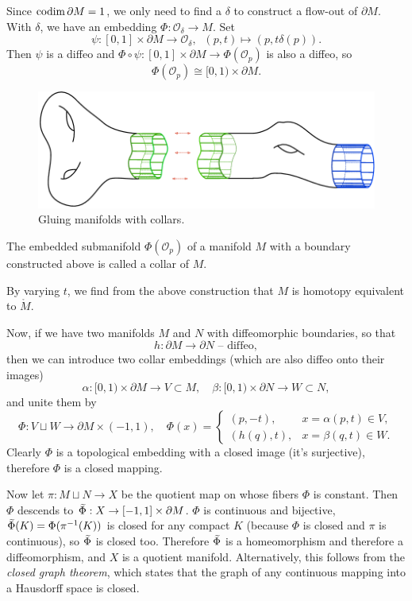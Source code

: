 Since $\operatorname{codim} \partial M=1$, we only need to find a $\delta$ to construct a flow-out of $\partial M$. With $\delta$, we have an embedding $\Phi:\mathcal{O}_\delta\to M$. Set 
\[\psi:[0,1]\times\partial M\to\mathcal{O}_\delta,\;\; (p,t)\mapsto (p,t\delta(p)).\]
Then $\psi$ is a diffeo and $\Phi\circ\psi:[0,1]\times\partial M\to \Phi(\mathcal{O}_p)$ is also a diffeo, so
\[\Phi(\mathcal{O}_p)\cong [0,1)\times\partial M.\]

\begin{figure}[tp]
    \centering
    \includegraphics[scale=0.2]{figures/collar.png}
    \caption{Gluing manifolds with collars.}
    \label{fig:collars}
\end{figure}

\begin{defn}[Collar]
    The embedded submanifold $\Phi(\mathcal{O}_p)$ of a manifold $M$ with a boundary constructed above is called a collar of $M$.
\end{defn}

\begin{cor}
    By varying $t$, we find from the above construction that $M$ is homotopy equivalent to $\mathring{M}$.
\end{cor}

Now, if we have two manifolds $M$ and $N$ with diffeomorphic boundaries, so that
\[h:\partial M\to \partial N\text{ -- diffeo},\]
then we can introduce two collar embeddings (which are also diffeo onto their images)
\[
\alpha:[0,1)\times\partial M\to V\subset M,\quad
\beta:[0,1)\times\partial N\to W\subset N,
\]
and unite them by
\[
\Phi: V\sqcup W\to \partial M\times (-1,1),\quad \Phi(x)=
\begin{cases}
(p,-t),& x=\alpha(p,t)\in V,\\
(h(q),t),& x=\beta(q,t)\in W.
\end{cases}
\]
Clearly $\Phi$  is a topological embedding with a closed image (it's surjective), therefore $\Phi$ is a closed mapping.

Now let $\pi:M\sqcup N\to X$ be the quotient map on whose fibers $\Phi$ is constant. Then $\Phi$ descends to $\wt{\Phi}:X\to [-1,1]\times\partial M$. $\Phi$ is continuous and bijective, $\wt{\Phi}(K)=\Phi(\pi^{-1}(K))$ is closed for any compact $K$ (because $\Phi$ is closed and $\pi$ is continuous), so $\wt{\Phi}$ is closed too. Therefore $\wt{\Phi}$ is a homeomorphism and therefore a diffeomorphism, and $X$ is a quotient manifold. Alternatively, this follows from the \emph{closed graph theorem}, which states that the graph of any continuous mapping into a Hausdorff space is closed.

